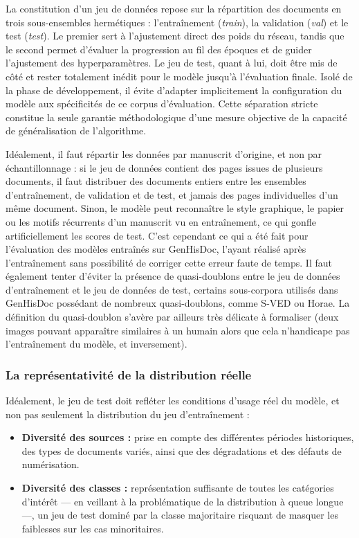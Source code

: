 La constitution d'un jeu de données repose sur la répartition des documents en trois sous-ensembles hermétiques : l'entraînement (\textit{train}), la validation (\textit{val}) et le test (\textit{test}). Le premier sert à l'ajustement direct des poids du réseau, tandis que le second permet d'évaluer la progression au fil des époques et de guider l'ajustement des hyperparamètres. Le jeu de test, quant à lui, doit être mis de côté et rester totalement inédit pour le modèle jusqu'à l'évaluation finale. Isolé de la phase de développement, il évite d'adapter implicitement la configuration du modèle aux spécificités de ce corpus d'évaluation. Cette séparation stricte constitue la seule garantie méthodologique d'une mesure objective de la capacité de généralisation de l'algorithme.

Idéalement, il faut répartir les données par manuscrit d'origine, et non par échantillonnage : si le jeu de données contient des pages issues de plusieurs documents, il faut distribuer des documents entiers entre les ensembles d'entraînement, de validation et de test, et jamais des pages individuelles d'un même document. Sinon, le modèle peut \og reconnaître \fg le style graphique, le papier ou les motifs récurrents d'un manuscrit vu en entraînement, ce qui gonfle artificiellement les scores de test. C'est cependant ce qui a été fait pour l'évaluation des modèles entraînés sur GenHisDoc, l'ayant réalisé après l'entraînement sans possibilité de corriger cette erreur faute de temps. Il faut également tenter d'éviter la présence de quasi-doublons entre le jeu de données d'entraînement et le jeu de données de test, certains sous-corpora utilisés dans GenHisDoc possédant de nombreux quasi-doublons, comme S-VED ou Horae. La définition du quasi-doublon s'avère par ailleurs très délicate à formaliser (deux images pouvant apparaître similaires à un humain alors que cela n'handicape pas l'entraînement du modèle, et inversement).

\subsubsection{La représentativité de la distribution réelle}

Idéalement, le jeu de test doit refléter les conditions d'usage réel du modèle, et non pas seulement la distribution du jeu d'entraînement :

\begin{itemize}
	\item \textbf{Diversité des sources :} prise en compte des différentes périodes historiques, des types de documents variés, ainsi que des dégradations et des défauts de numérisation.
	
	\item \textbf{Diversité des classes :} représentation suffisante de toutes les catégories d'intérêt — en veillant à la problématique de la distribution à queue longue —, un jeu de test dominé par la classe majoritaire risquant de masquer les faiblesses sur les cas minoritaires.
\end{itemize}

